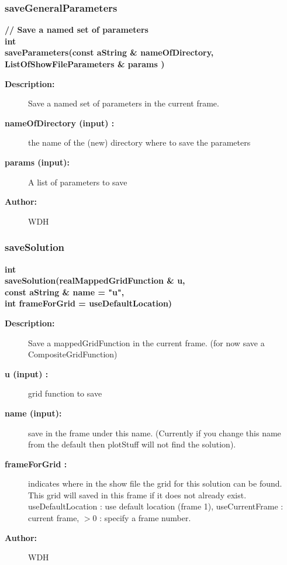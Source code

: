 \subsubsection{saveGeneralParameters}
 
\begin{flushleft} \textbf{%
  // Save a named set of parameters\\int  \\ 
\settowidth{\OgshowIncludeArgIndent}{saveParameters(}%
saveParameters(const aString \& nameOfDirectory, ListOfShowFileParameters \& params )
}\end{flushleft}
\begin{description}
\item[{\bf Description:}] 
   Save a named set of parameters in the current frame.
\item[{\bf nameOfDirectory (input) :}]  the name of the (new) directory where to save the parameters
\item[{\bf params (input):}]  A list of parameters to save
 
\item[{\bf Author:}]  WDH
\end{description}
\subsubsection{saveSolution}
 
\begin{flushleft} \textbf{%
int  \\ 
\settowidth{\OgshowIncludeArgIndent}{saveSolution(}%
saveSolution(realMappedGridFunction \& u, \\ 
\hspace{\OgshowIncludeArgIndent}const aString \& name  = "u",\\ 
\hspace{\OgshowIncludeArgIndent}int frameForGrid  = useDefaultLocation)
}\end{flushleft}
\begin{description}
\item[{\bf Description:}] 
   Save a mappedGridFunction in the current frame.
   (for now save a CompositeGridFunction)
\item[{\bf u (input) :}]  grid function to save
\item[{\bf name (input):}]  save in the frame under this name. (Currently if you change this name
   from the default then plotStuff will not find the solution).
\item[{\bf frameForGrid :}]  indicates where in the show file the grid for this solution can be found.
    This grid will saved in this frame if it does not already exist.
     useDefaultLocation : use default location (frame 1), useCurrentFrame : current frame, 
      $>0$ : specify a frame number.
\item[{\bf Author:}]  WDH
\end{description}
